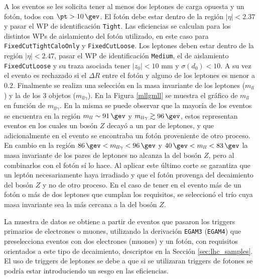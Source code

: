 A los eventos se les solicita tener al menos dos leptones de carga opuesta y un fotón, todos con $\pt>10\,\gev$. El fotón debe estar dentro de la región $|\eta| < 2.37$ y pasar el WP de identificación \texttt{Tight}. Las eficiencias se calculan para los distintos WPs de aislamiento del fotón utilizado, en este caso para \texttt{FixedCutTightCaloOnly} y \texttt{FixedCutLoose}. Los leptones deben estar dentro de la región $|\eta| < 2.47$, pasar el WP de identificación \texttt{Medium}, el de aislamiento \texttt{FixedCutLoose} y su traza asociada tener $|z_0| < 10$ mm y $\sigma(d_0) < 10$. A su vez el evento es rechazado si el $\Delta R$ entre el fotón y alguno de los leptones es menor a 0.2. Finalmente se realiza una selección en la masa invariante de los leptones ($m_{ll}$) y la de los 3 objetos ($m_{ll\gamma}$). En la Figura \ref{mllgmll} se muestra el gráfico de $m_{ll}$ en función de $m_{ll\gamma}$. En la misma se puede observar que la mayoría de los eventos se encuentra en la región $m_{ll}\sim91\,\gev$ y $m_{ll\gamma}\gtrsim96\,\gev$, estos representan eventos en los cuales un bosón $Z$ decayó a un par de leptones, y que adicionalmente en el evento se encontraba un fotón proveniente de otro proceso. En cambio en la región $86\,\gev<m_{ll\gamma}<96\,\gev$ y $40\,\gev<m_{ll}<83\,\gev$ la masa invariante de los pares de leptones no alcanza la del bosón $Z$, pero al combinarlos con el fotón sí lo hace. Al aplicar este último corte se garantiza que un leptón necesariamente haya irradiado y que el fotón provenga del decaimiento del bosón $Z$ y no de otro proceso. En el caso de tener en el evento más de un fotón o más de dos leptones que cumplan los requisitos, se seleccionó el trío cuya masa invariante sea la más cercana a la del bosón $Z$.


La muestra de datos se obtiene a partir de eventos que pasaron los triggers primarios de electrones o muones, utilizando la derivación \texttt{EGAM3} (\texttt{EGAM4}) que preselecciona eventos con dos electrones (muones) y un fotón, con requisitos orientados a este tipo de decaimiento, descriptos en la Sección \ref{sec:lhc_samples}. El uso de triggers de leptones se debe a que si se utilizaran triggers de fotones se podría estar introduciendo un sesgo en las eficiencias.


